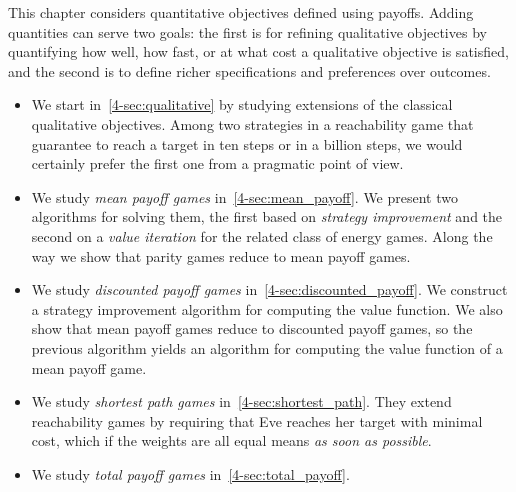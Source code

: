This chapter considers quantitative objectives defined using payoffs. 
Adding quantities can serve two goals:
the first is for refining qualitative objectives by quantifying how well, how fast, or at what cost a qualitative objective is satisfied,
and the second is to define richer specifications and preferences over outcomes.
\begin{itemize}
	\item We start in~\cref{4-sec:qualitative} by studying extensions of the classical qualitative objectives. Among two strategies in a reachability game that guarantee to reach a target in ten steps or in a billion steps, we would certainly prefer the first one from a pragmatic point of view.

	\item We study \emph{mean payoff games} in~\cref{4-sec:mean_payoff}. 
	We present two algorithms for solving them, the first based on \emph{strategy improvement} and the second on a \emph{value iteration} for the related class of energy games.
	Along the way we show that parity games reduce to mean payoff games.

	\item We study \emph{discounted payoff games} in~\cref{4-sec:discounted_payoff}.
	We construct a strategy improvement algorithm for computing the value function.
	We also show that mean payoff games reduce to discounted payoff games, so the previous algorithm yields an algorithm for computing the value function of a mean payoff game.

	\item We study \emph{shortest path games} in~\cref{4-sec:shortest_path}.
	They extend reachability games by requiring that Eve reaches her target with minimal cost, 
	which if the weights are all equal means \emph{as soon as possible}.
	
	\item We study \emph{total payoff games} in~\cref{4-sec:total_payoff}.
\end{itemize}
